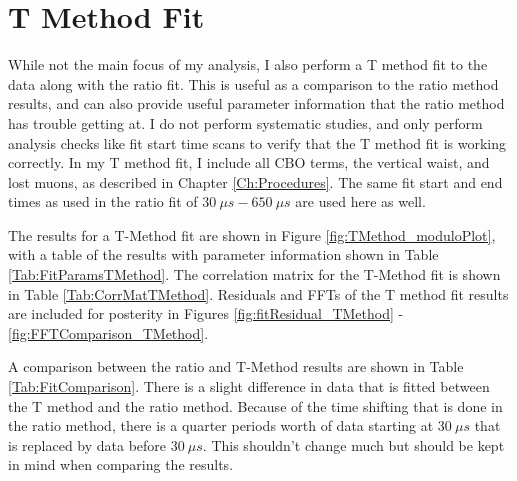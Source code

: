 \graphicspath{ {Figures/TMethod/Main/} {Figures/TMethod/ResidualsFFT/} {Figures/TMethod/Comparison/} {Figures/TMethod/RandomSeeds/} }

\chapter{T Method Fit}
\label{Ch:TMethod}

While not the main focus of my analysis, I also perform a T method fit to the data along with the ratio fit. This is useful as a comparison to the ratio method results, and can also provide useful parameter information that the ratio method has trouble getting at. I do not perform systematic studies, and only perform analysis checks like fit start time scans to verify that the T method fit is working correctly. In my T method fit, I include all CBO terms, the vertical waist, and lost muons, as described in Chapter \ref{Ch:Procedures}. The same fit start and end times as used in the ratio fit of $\SI{30}{\mu s} - \SI{650}{\mu s}$ are used here as well.

The results for a T-Method fit are shown in Figure \ref{fig:TMethod_moduloPlot}, with a table of the results with parameter information shown in Table \ref{Tab:FitParamsTMethod}. The correlation matrix for the T-Method fit is shown in Table \ref{Tab:CorrMatTMethod}. Residuals and FFTs of the T method fit results are included for posterity in Figures \ref{fig:fitResidual_TMethod} - \ref{fig:FFTComparison_TMethod}.

A comparison between the ratio and T-Method results are shown in Table \ref{Tab:FitComparison}. There is a slight difference in data that is fitted between the T method and the ratio method. Because of the time shifting that is done in the ratio method, there is a quarter \gmtwo periods worth of data starting at $\SI{30}{\mu s}$ that is replaced by data before $\SI{30}{\mu s}$. This shouldn't change much but should be kept in mind when comparing the results.

